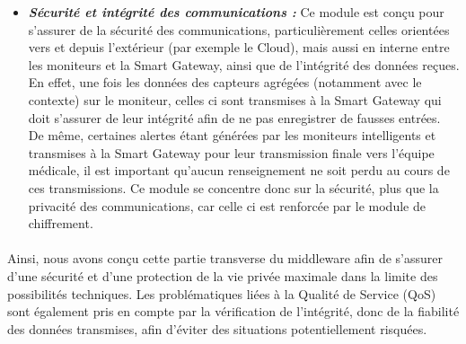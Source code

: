 \begin{itemize}
\item \textbf{\textit{Sécurité et intégrité des communications :}} Ce module est conçu pour s'assurer de la sécurité des communications, particulièrement celles orientées vers et depuis l'extérieur (par exemple le Cloud), mais aussi en interne entre les moniteurs et la Smart Gateway, ainsi que de l'intégrité des données reçues. En effet, une fois les données des capteurs agrégées (notamment avec le contexte) sur le moniteur, celles ci sont transmises à la Smart Gateway qui doit s'assurer de leur intégrité afin de ne pas enregistrer de fausses entrées. De même, certaines alertes étant générées par les moniteurs intelligents et transmises à la Smart Gateway pour leur transmission finale vers l'équipe médicale, il est important qu'aucun renseignement ne soit perdu au cours de ces transmissions. Ce module se concentre donc sur la sécurité, plus que la privacité des communications, car celle ci est renforcée par le module de chiffrement.\\
\end{itemize}
\paragraph{}
Ainsi, nous avons conçu cette partie transverse du middleware afin de s'assurer d'une sécurité et d'une protection de la vie privée maximale dans la limite des possibilités techniques. Les problématiques liées à la Qualité de Service (QoS) sont également pris en compte par la vérification de l'intégrité, donc de la fiabilité des données transmises, afin d'éviter des situations potentiellement risquées.